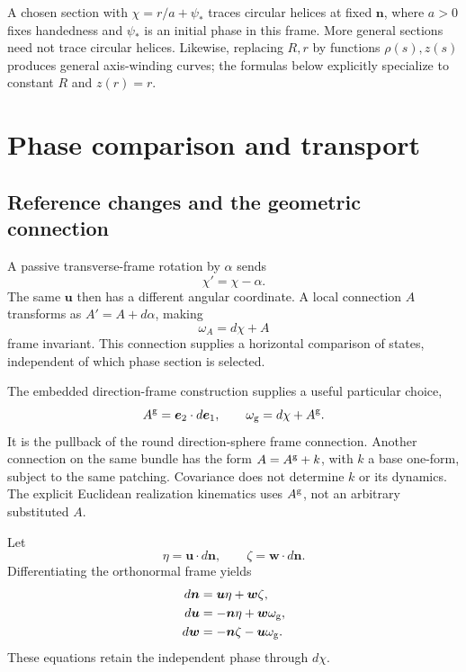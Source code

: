 \documentclass[11pt]{article}
\newcommand{\n}{\bm n}
\newcommand{\uu}{\bm u}
\newcommand{\ww}{\bm w}
\newcommand{\Ag}{A^{\rm g}}
\begin{document}
A chosen section with $\chi=r/a+\psi_*$ traces circular helices at fixed $\n$, where $a>0$ fixes handedness and $\psi_*$ is an initial phase in this frame. More general sections need not trace circular helices. Likewise, replacing $R,r$ by functions $\rho(s),z(s)$ produces general axis-winding curves; the formulas below explicitly specialize to constant $R$ and $z(r)=r$.

\section{Phase comparison and transport}

\subsection{Reference changes and the geometric connection}

A passive transverse-frame rotation by $\alpha$ sends
\begin{equation}
 \chi'=\chi-\alpha.
\end{equation}
The same $\uu$ then has a different angular coordinate. A local connection $A$ transforms as $A'=A+d\alpha$, making
\begin{equation}
 \omega_A=d\chi+A
 \label{eq:omega}
\end{equation}
frame invariant. This connection supplies a horizontal comparison of states, independent of which phase section is selected.

The embedded direction-frame construction supplies a useful particular choice,
\begin{equation}
 \Ag=\bm e_2\cdot d\bm e_1,
 \qquad \omega_{\rm g}=d\chi+\Ag.
 \label{eq:Ag}
\end{equation}
It is the pullback of the round direction-sphere frame connection. Another connection on the same bundle has the form $A=\Ag+k$, with $k$ a base one-form, subject to the same patching. Covariance does not determine $k$ or its dynamics. The explicit Euclidean realization kinematics uses $\Ag$, not an arbitrary substituted $A$.

Let
\begin{equation}
 \eta=\uu\cdot d\n,\qquad\zeta=\ww\cdot d\n.
 \label{eq:coframe}
\end{equation}
Differentiating the orthonormal frame yields
\begin{equation}
 \begin{aligned}
 d\n&=\uu\eta+\ww\zeta,\\
 d\uu&=-\n\eta+\ww\omega_{\rm g},\\
 d\ww&=-\n\zeta-\uu\omega_{\rm g}.
 \end{aligned}
 \label{eq:frameeq}
\end{equation}
These equations retain the independent phase through $d\chi$.
\end{document}
